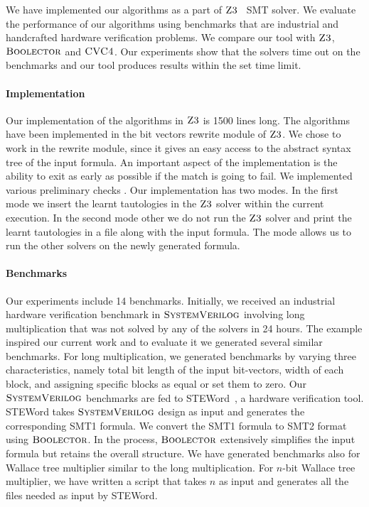 

We have implemented our algorithms as a part of $\textsc{Z3}$~\cite{z3} SMT solver.
%
 We evaluate the performance of our algorithms using benchmarks that are industrial and handcrafted hardware verification problems.
%
We compare our tool with $\textsc{Z3}$, $\textsc{Boolector}$\cite{boolector} and $\textsc{CVC4}$\cite{cvc4}.
%
Our experiments show that the solvers time out on the benchmarks and our tool produces results within the set time limit.

\paragraph{\bf Implementation}
Our implementation of the algorithms in $\textsc{Z3}$ is 1500 lines long.
%
The algorithms have been implemented in the bit vectors rewrite module of $\textsc{Z3}$.
%
We chose to work in the rewrite module, since it gives an easy access to the abstract syntax tree of the input formula.
%
An important aspect of the implementation is the ability to exit as early as possible if the match is going to fail.
%
We implemented various preliminary checks .
%
Our implementation has two modes.
%
In the first mode we insert the learnt tautologies in the $\textsc{Z3}$ solver within the current execution.
%
In the second mode other we do not run  the $\textsc{Z3}$ solver and print the learnt tautologies in a file along with the input formula.
%
The mode allows us to run the other solvers on the newly generated formula.

\paragraph{\bf Benchmarks}
%
Our experiments include 14 benchmarks.
%
Initially, we received an industrial hardware verification benchmark in $\textsc{SystemVerilog}$ involving long multiplication that was not solved by any of the solvers in 24 hours.
%
The example inspired our current work and to evaluate it we generated several similar benchmarks.
%
For long multiplication, we generated benchmarks by varying three characteristics, namely total bit length of the input bit-vectors, width of each block, and assigning specific blocks as equal or set them to zero.
%
Our $\textsc{SystemVerilog}$ benchmarks are fed to STEWord~\cite{Word-level-Symbolic-Trajectory-Evaluation}, a hardware verification tool.
%
STEWord takes $\textsc{SystemVerilog}$ design as input and generates the corresponding SMT1 formula.
%
We convert the SMT1 formula to SMT2 format using $\textsc{Boolector}$.
%
In the process, $\textsc{Boolector}$ extensively simplifies the input formula but retains the overall structure.
%
We have generated benchmarks also for Wallace tree multiplier similar to the long multiplication.
%
For $n$-bit Wallace tree multiplier, we have written a script that takes $n$ as input and generates all the files needed as input by STEWord.
%

